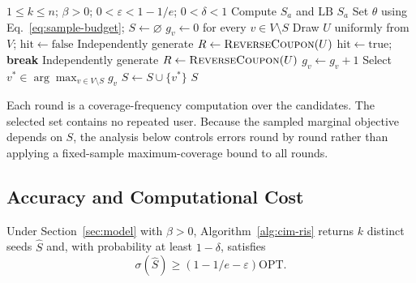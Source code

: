 \begin{algorithm}[t]
\caption{\CIMRIS{}$(G,k,\varepsilon,\delta)$ by Marginal Reverse Sampling}
\label{alg:cim-ris}
\begin{algorithmic}[1]
\Require $1\leq k\leq n$; $\beta>0$; $0<\varepsilon<1-1/e$; $0<\delta<1$
\State Compute $S_a$ and $\mathrm{LB}$
  \State \Return $S_a$
\EndIf
\State Set $\theta$ using Eq.~\eqref{eq:sample-budget}; $S\gets\varnothing$
  \State $g_v\gets0$ for every $v\in V\setminus S$
    \State Draw $U$ uniformly from $V$; $\mathrm{hit}\gets\mathrm{false}$
      \State Independently generate $R\gets\textsc{ReverseCoupon}(U)$
        \State $\mathrm{hit}\gets\mathrm{true}$; \textbf{break}
      \EndIf
    \EndFor
      \State Independently generate $R\gets\textsc{ReverseCoupon}(U)$
        \State $g_v\gets g_v+1$
      \EndFor
    \EndIf
  \EndFor
  \State Select $v^*\in\arg\max_{v\in V\setminus S}g_v$
  \State $S\gets S\cup\{v^*\}$
\EndFor
\State \Return $S$
\end{algorithmic}
\end{algorithm}

Each round is a coverage-frequency computation over the candidates.
The selected set contains no repeated user. Because the sampled
marginal objective depends on $S$, the analysis below controls errors
round by round rather than applying a fixed-sample maximum-coverage
bound to all rounds.

\subsection{Accuracy and Computational Cost}

\begin{theorem}
\label{thm:approx}
Under Section~\ref{sec:model} with $\beta>0$,
Algorithm~\ref{alg:cim-ris} returns $k$ distinct seeds $\hat S$ and,
with probability at least $1-\delta$, satisfies
\[
  \sigma(\hat S)\geq(1-1/e-\varepsilon)\mathrm{OPT}.
\]
\end{theorem}

